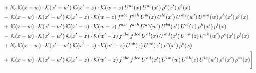\documentclass[9pt]{article}
\numberwithin{equation}{section}
\begin{document}
\begin{align}
& +N_{c}\,\mathcal{K}(x-w)\cdot\mathcal{K}(x'-w')\,\mathcal{K}(x'-z)\cdot\mathcal{K}(w-z)\,U^{ab}(x)\,U^{ac}(x')\,\rho^{c}(x')\,\rho^{b}(x)\notag\\
& -\,\mathcal{K}(x-w)\cdot\mathcal{K}(x'-w')\,\mathcal{K}(x'-z)\cdot\mathcal{K}(w-z)\,f^{abc}\,f^{deh}\,U^{bl}(z)\,U^{ld}(x')\,U^{me}(w')\,U^{am}(w)\,\rho^{h}(x')\,\rho^{c}(x)\notag\\
& +\,\mathcal{K}(x-w)\cdot\mathcal{K}(x'-w')\,\mathcal{K}(x'-z)\cdot\mathcal{K}(w-z)\,f^{abc}\,f^{deh}\,U^{ae}(w')\,U^{bd}(x')\,U^{cl}(x)\,\rho^{h}(x')\,\rho^{l}(x)\notag\\
& -\,\mathcal{K}(x-w)\cdot\mathcal{K}(x'-w')\,\mathcal{K}(x'-z)\cdot\mathcal{K}(w'-z)\,f^{abc}\,f^{dce}\,U^{hl}(x)\,U^{md}(x')\,U^{mb}(z)\,U^{ah}(w')\,\rho^{e}(x')\,\rho^{l}(x)\notag\\
& +N_{c}\,\mathcal{K}(x-w)\cdot\mathcal{K}(x'-w')\,\mathcal{K}(x'-z)\cdot\mathcal{K}(w'-z)\,U^{ab}(x)\,U^{ac}(x')\,\rho^{c}(x')\,\rho^{b}(x)\notag\\
& +\,\mathcal{K}(x-w)\cdot\mathcal{K}(x'-w')\,\mathcal{K}(x'-z)\cdot\mathcal{K}(w'-z)\,f^{abc}\,f^{dce}\,U^{hd}(x')\,U^{lm}(w)\,U^{hb}(z)\,U^{la}(w')\,\rho^{e}(x')\,\rho^{m}(x)\Bigg]
\end{align}
\end{document}
